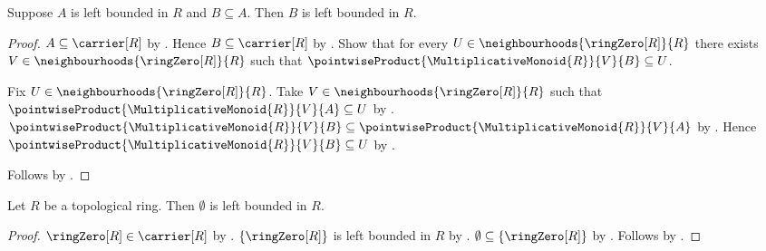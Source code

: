 \begin{proposition}\label{left_bounded_downward}
    Suppose $A$ is left bounded in $R$ and $B\subseteq A$.
    Then $B$ is left bounded in $R$.
\end{proposition}
\begin{proof}
    $A\subseteq\carrier[R]$ by .
    Hence $B\subseteq\carrier[R]$ by .
    Show that for every $U\in\neighbourhoods{\ringZero[R]}{R}$ there exists
        $V\in\neighbourhoods{\ringZero[R]}{R}$ such that
        $\pointwiseProduct{\MultiplicativeMonoid{R}}{V}{B}\subseteq U$.
    \begin{subproof}
        Fix $U\in\neighbourhoods{\ringZero[R]}{R}$.
        Take $V\in\neighbourhoods{\ringZero[R]}{R}$ such that
            $\pointwiseProduct{\MultiplicativeMonoid{R}}{V}{A}\subseteq U$
            by .
        $\pointwiseProduct{\MultiplicativeMonoid{R}}{V}{B}\subseteq
            \pointwiseProduct{\MultiplicativeMonoid{R}}{V}{A}$ by
            .
        Hence $\pointwiseProduct{\MultiplicativeMonoid{R}}{V}{B}\subseteq U$
            by .
    \end{subproof}
    Follows by .
\end{proof}

\begin{proposition}\label{left_bounded_emptyset}
    Let $R$ be a topological ring.
    Then $\emptyset$ is left bounded in $R$.
\end{proposition}
\begin{proof}
    $\ringZero[R]\in\carrier[R]$ by .
    $\{\ringZero[R]\}$ is left bounded in $R$ by
        .
    $\emptyset\subseteq\{\ringZero[R]\}$ by .
    Follows by .
\end{proof}

